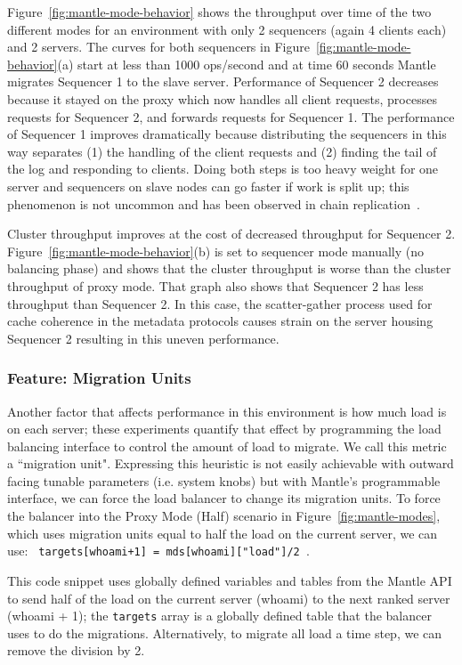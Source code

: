 \documentclass[preprint]{sigplanconf-eurosys}
\begin{document}
Figure~\ref{fig:mantle-mode-behavior} shows the throughput over time of the two
different modes for an environment with only 2 sequencers (again 4 clients
each) and 2 servers. The curves for both sequencers in
Figure~\ref{fig:mantle-mode-behavior}(a) start at less than 1000 ops/second and
at time 60 seconds Mantle migrates Sequencer 1 to the slave server.
Performance of Sequencer 2 decreases because it stayed on the proxy which now
handles all client requests, processes requests for Sequencer 2, and forwards
requests for Sequencer 1. The performance of Sequencer 1 improves dramatically
because distributing the sequencers in this way separates (1) the handling of
the client requests and (2) finding the tail of the log and responding to
clients.  Doing both steps is too heavy weight for one server and sequencers on
slave nodes can go faster if work is split up; this phenomenon is not
uncommon and has been observed in chain replication~\cite{chain_rep}.

Cluster
throughput improves at the cost of decreased throughput for Sequencer 2.
Figure~\ref{fig:mantle-mode-behavior}(b) is set to sequencer mode manually (no
balancing phase) and shows that the cluster throughput is worse than the
cluster throughput of proxy mode. That graph also shows that Sequencer 2 has
less throughput than Sequencer 2. In this case, the scatter-gather process used
for cache coherence in the metadata protocols causes strain on the server
housing Sequencer 2 resulting in this uneven performance. 

\subsubsection{Feature: Migration Units}
\label{sec:feature-migration-units}

Another factor that affects performance in this environment is how much load
is on each server; these experiments quantify that effect by programming the
load balancing interface to control the amount of load to migrate. We call this
metric a ``migration unit".  Expressing this heuristic is not easily achievable
with outward facing tunable parameters (i.e. system knobs) but with Mantle's
programmable interface, we can force the load balancer to change its migration
units. To force the balancer into the Proxy Mode (Half) scenario in
Figure~\ref{fig:mantle-modes}, which uses migration units equal to half the
load on the current server, we can use: \texttt{ targets[whoami+1] = mds[whoami]["load"]/2
}.

This code snippet uses globally defined variables and tables from the Mantle
API to send half of the load on the current server (whoami) to the next ranked
server (whoami + 1); the \texttt{targets} array is a globally defined table that
the balancer uses to do the migrations. Alternatively, to migrate all load a
time step, we can remove the division by 2.
\end{document}
